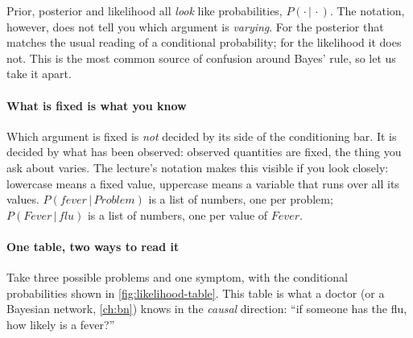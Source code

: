 \documentclass[11pt, oneside]{book}
\newcommand{\Prob}{\mathbb{P}}           %
\newcommand{\given}{\,\vert\,}           %
\newcommand{\vn}[1]{\mathit{#1}}         %
\begin{document}
Prior, posterior and likelihood all \emph{look} like probabilities, $P(\cdot
\given \cdot)$. The notation, however, does not tell you which argument is
\emph{varying}. For the posterior that matches the usual reading of a
conditional probability; for the likelihood it does not. This is the most
common source of confusion around Bayes' rule, so let us take it apart.

\paragraph{What is fixed is what you know} Which argument is fixed is
\emph{not} decided by its side of the conditioning bar. It is decided by what
has been observed: observed quantities are fixed, the thing you ask about
varies. The lecture's notation makes this visible if you look closely:
lowercase means a fixed value, uppercase means a variable that runs over all
its values. $P(\vn{fever} \given \vn{Problem})$ is a list of numbers, one per
problem; $P(\vn{Fever} \given \vn{flu})$ is a list of numbers, one per value
of $\vn{Fever}$.

\paragraph{One table, two ways to read it} Take three possible problems and one
symptom, with the conditional probabilities shown in
\cref{fig:likelihood-table}. This table is what a doctor (or a Bayesian
network, \cref{ch:bn}) knows in the \emph{causal} direction: ``if someone
has the flu, how likely is a fever?''
\end{document}
